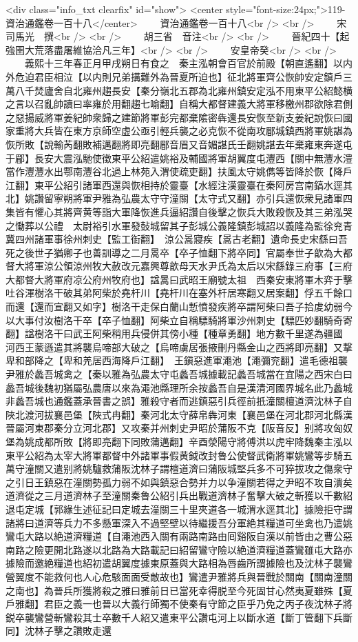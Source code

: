 <div class="info_txt clearfix" id="show">
<center style="font-size:24px;">119-資治通鑑卷一百十八</center>
  　　資治通鑑卷一百十八<br />
<br />
　　宋　司馬光　撰<br />
<br />
　　胡三省　音注<br />
<br />
　　晉紀四十【起強圉大荒落盡屠維協洽凡三年】<br />
<br />
　　安皇帝癸<br />
<br />
　　義熙十三年春正月甲戌朔日有食之　秦主泓朝會百官於前殿【朝直遙翻】以内外危迫君臣相泣【以内則兄弟搆難外為晉夏所迫也】征北將軍齊公恢帥安定鎮戶三萬八千焚廬舍自北雍州趨長安【秦分嶺北五郡為北雍州鎮安定泓不用東平公紹懿横之言以召亂帥讀曰率雍於用翻趨七喻翻】自稱大都督建義大將軍移檄州郡欲除君側之惡揚威將軍姜紀帥衆歸之建節將軍彭完都棄隂密犇還長安恢至新支姜紀說恢曰國家重將大兵皆在東方京師空虚公亟引輕兵襲之必克恢不從南攻郿城鎮西將軍姚諶為恢所敗【說輸芮翻敗補邁翻將即亮翻郿音眉又音媚諶氏壬翻姚諶去年棄雍東奔遂屯于郿】長安大震泓馳使徵東平公紹遣姚裕及輔國將軍胡翼度屯灃西【關中無灃水澧當作灃灃水出鄠南灃谷北過上林苑入渭使疏吏翻】扶風太守姚儁等皆降於恢【降戶江翻】東平公紹引諸軍西還與恢相持於靈臺【水經注漢靈臺在秦阿房宫南鎬水逕其北】姚讚留寧朔將軍尹雅為弘農太守守潼關【太守式又翻】亦引兵還恢衆見諸軍四集皆有懼心其將齊黄等詣大軍降恢進兵逼紹讚自後擊之恢兵大敗殺恢及其三弟泓哭之慟葬以公禮　太尉裕引水軍發鼔城留其子彭城公義隆鎮彭城詔以義隆為監徐兖青冀四州諸軍事徐州刺史【監工衘翻】　涼公暠寢疾【暠古老翻】遺命長史宋繇曰吾死之後世子猶卿子也善訓導之二月暠卒【卒子恤翻下將卒同】官屬奉世子歆為大都督大將軍涼公領涼州牧大赦改元嘉興尊歆母天水尹氏為太后以宋繇錄三府事【三府大都督大將軍府凉公府州牧府也】諡暠曰武昭王廟號太祖　西秦安東將軍木弈于擊吐谷渾樹洛干破其弟阿柴於堯杆川【堯杆川在塞外杆居寒翻又居案翻】俘五千餘口而還【還而宣翻又如字】樹洛干走保白蘭山慙憤發疾將卒謂阿柴曰吾子拾䖍幼弱今以大事付汝樹洛干卒【卒子恤翻】阿柴立自稱驃騎將軍沙州刺史【驃匹妙翻騎奇寄翻】諡樹洛干曰武王阿柴稍用兵侵併其傍小種【種章勇翻】地方數千里遂為疆國　河西王蒙遜遣其將襲烏啼部大破之【烏啼虜居張掖刪丹縣金山之西將即亮翻】又撃卑和部降之【卑和羌居西海降戶江翻】　王鎭惡進軍澠池【澠彌兖翻】遣毛德祖襲尹雅於蠡吾城禽之【秦以雅為弘農太守屯蠡吾城據載記蠡吾城當在宜陽之西宋白曰蠡吾城後魏初猶屬弘農唐以來為澠池縣理所余按蠡吾自是漢清河國界城名此乃蠡城非蠡吾城也通鑑蓋承晉書之誤】雅殺守者而逃鎮惡引兵徑前扺潼關檀道濟沈林子自陜北渡河拔襄邑堡【陜式冉翻】秦河北太守薛帛犇河東【襄邑堡在河北郡河北縣漢晉屬河東郡秦分立河北郡】又攻秦并州刺史尹昭於蒲阪不克【阪音反】别將攻匈奴堡為姚成都所敗【將即亮翻下同敗蒲邁翻】辛酉滎陽守將傅洪以虎牢降魏秦主泓以東平公紹為太宰大將軍都督中外諸軍事假黄鉞改封魯公使督武衛將軍姚鸞等步騎五萬守潼關又遣别將姚驢救蒲阪沈林子謂檀道濟曰蒲阪城堅兵多不可猝拔攻之傷衆守之引日王鎮惡在潼關勢孤力弱不如與鎮惡合勢并力以争潼關若得之尹昭不攻自潰矣道濟從之三月道濟林子至潼關秦魯公紹引兵出戰道濟林子奮擊大破之斬獲以千數紹退屯定城【郭緣生述征記曰定城去潼關三十里夾道各一城渭水逕其北】據險拒守謂諸將曰道濟等兵力不多懸軍深入不過堅壁以待繼援吾分軍絶其糧道可坐禽也乃遣姚鸞屯大路以絶道濟糧道【自澠池西入關有兩路南路由囘谿阪自漢以前皆由之曹公惡南路之險更開北路遂以北路為大路載記曰紹留鸞守險以絶道濟糧道蓋鸞雖屯大路亦據險而邀絶糧道也紹初遣胡翼度據東原蓋與大路相為唇齒所謂據險也及沈林子襲鸞營翼度不能救何也人心危駭面面受敵故也】鸞遣尹雅將兵與晉戰於關南【關南潼關之南也】為晉兵所獲將殺之雅曰雅前日已當死幸得脱至今死固甘心然夷夏雖殊【夏戶雅翻】君臣之義一也晉以大義行師獨不使秦有守節之臣乎乃免之丙子夜沈林子將鋭卒襲鸞營斬鸞殺其士卒數千人紹又遣東平公讚屯河上以斷水道【斷丁管翻下兵斷同】沈林子擊之讚敗走還